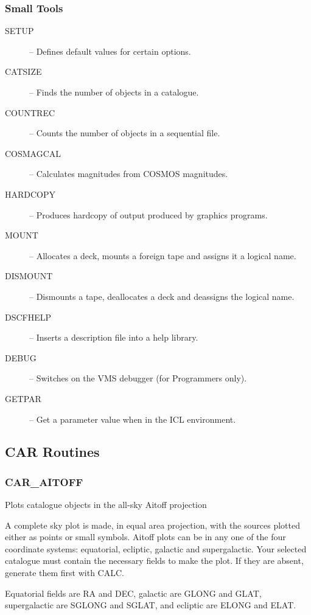 \subsubsection {Small Tools}
\begin{description}
\begin{description}
\item [SETUP] -- Defines default values for certain options.
\item [CATSIZE] -- Finds the number of objects in a catalogue.
\item [COUNTREC] -- Counts the number of objects in a sequential file.
\item [COSMAGCAL] -- Calculates magnitudes from COSMOS magnitudes.
\item [HARDCOPY] -- Produces hardcopy of output produced by graphics programs.
\item [MOUNT] -- Allocates a deck, mounts a foreign tape and assigns it a
logical name.
\item [DISMOUNT] -- Dismounts a tape, deallocates a deck and deassigns the
logical name.
\item [DSCFHELP] -- Inserts a description file into a help library.
\item [DEBUG] -- Switches on the VMS debugger (for Programmers only).
\item [GETPAR] -- Get a parameter value when in the ICL environment.
\end{description}
\end{description}


\subsection {CAR Routines}

\subsubsection{CAR\_AITOFF}

Plots catalogue objects in the all-sky Aitoff projection

A complete sky plot is made, in equal area projection, with the sources
plotted either as points or small symbols.
Aitoff plots can be in any one of the four coordinate systems:
equatorial, ecliptic, galactic and supergalactic.
Your selected catalogue must contain the necessary fields to make the plot.
If they are absent, generate them first with CALC.

Equatorial fields are RA and DEC, galactic are GLONG and GLAT,
supergalactic are SGLONG and SGLAT, and ecliptic are ELONG
and ELAT.

